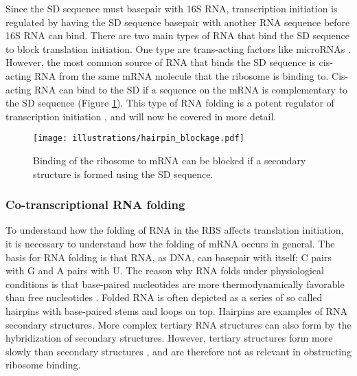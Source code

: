 Since the SD sequence must basepair with 16S RNA, transcription initiation is
regulated by having the SD sequence basepair with another RNA sequence before
16S RNA can bind. There are two main types of RNA that bind the SD sequence to
block translation initiation. One type are trans-acting factors like microRNAs
\cite{storz_controlling_2004}. However, the most common source of RNA that
binds the SD sequence is cis-acting RNA from the same mRNA molecule that the
ribosome is binding to. Cis-acting RNA can bind to the SD if a sequence on the
mRNA is complementary to the SD sequence (Figure \ref{fig:hairpin_blockage}).
This type of RNA folding is a potent regulator of transcription initiation
\cite{hall_role_1982, de_smit_secondary_1990}, and will now be covered in more
detail.

\begin{figure}[h]
	\begin{center}
		\texttt{[image: illustrations/hairpin\_blockage.pdf]}
	\end{center}
	\caption{Binding of the ribosome to mRNA can be blocked if a secondary
	structure is formed using the SD sequence.}
	\label{fig:hairpin_blockage}
\end{figure}

\subsubsection{Co-transcriptional RNA folding}
To understand how the folding of RNA in the RBS affects translation initiation,
it is necessary to understand how the folding of mRNA occurs in general. The
basis for RNA folding is that RNA, as DNA, can basepair with itself; C pairs
with G and A pairs with U. The reason why RNA folds under physiological
conditions is that base-paired nucleotides are more thermodynamically favorable
than free nucleotides \cite{onoa_rna_2004}. Folded RNA is often depicted as a
series of so called hairpins with base-paired stems and loops on top. Hairpins
are examples of RNA secondary structures. More complex tertiary RNA structures
can also form by the hybridization of secondary structures. However, tertiary
structures form more slowly than secondary structures \cite{onoa_rna_2004}, and
are therefore not as relevant in obstructing ribosome binding.

